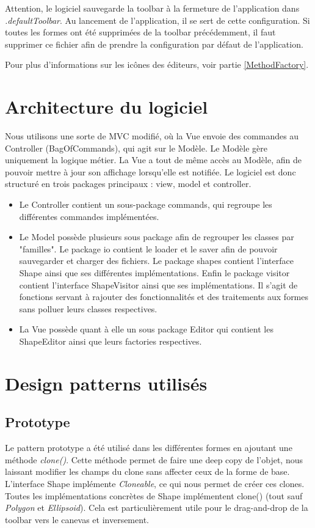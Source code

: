 \documentclass{article}
\begin{document}
Attention, le logiciel sauvegarde la toolbar à la fermeture de l'application dans \textit{.defaultToolbar}. Au lancement de l'application, il se sert de cette configuration.
Si toutes les formes ont été supprimées de la toolbar précédemment, il faut supprimer ce fichier afin de prendre la configuration par défaut de l'application.

Pour plus d'informations sur les icônes des éditeurs, voir partie \ref{MethodFactory}.


\section{Architecture du logiciel}

Nous utilisons une sorte de MVC modifié, où la Vue envoie des commandes au Controller (BagOfCommands), qui agit sur le Modèle. Le Modèle gère uniquement la logique métier. La Vue a tout de même accès au Modèle,
afin de pouvoir mettre à jour son affichage lorsqu'elle est notifiée.
Le logiciel est donc structuré en trois packages principaux : view, model et controller.
\begin{itemize}
    \item Le Controller contient un sous-package commands, qui regroupe les différentes commandes implémentées.
    \item Le Model possède plusieurs sous package afin de regrouper les classes par "familles". Le package io contient le loader et le saver afin de pouvoir sauvegarder et charger des fichiers. Le package shapes contient l'interface Shape ainsi que ses différentes implémentations. Enfin le package visitor contient l'interface ShapeVisitor ainsi que ses implémentations. Il s'agit
    de fonctions servant à rajouter des fonctionnalités et des traitements aux formes sans polluer leurs classes respectives.
    \item La Vue possède quant à elle un sous package Editor qui contient les ShapeEditor ainsi que leurs factories respectives.


\end{itemize}



\section{Design patterns utilisés} \label{sec2}

\subsection{Prototype}
Le pattern prototype a été utilisé dans les différentes formes en ajoutant une méthode \textit{clone()}. Cette méthode permet de faire une deep copy de l'objet,
 nous laissant modifier les champs du clone sans affecter ceux de la forme de base.
 L'interface Shape implémente \textit{Cloneable}, ce qui nous permet de créer ces clones.
 Toutes les implémentations concrètes de Shape implémentent clone() (tout sauf \textit{Polygon} et \textit{Ellipsoid}).
 Cela est particulièrement utile pour le drag-and-drop de la toolbar vers le canevas et inversement.
\end{document}
